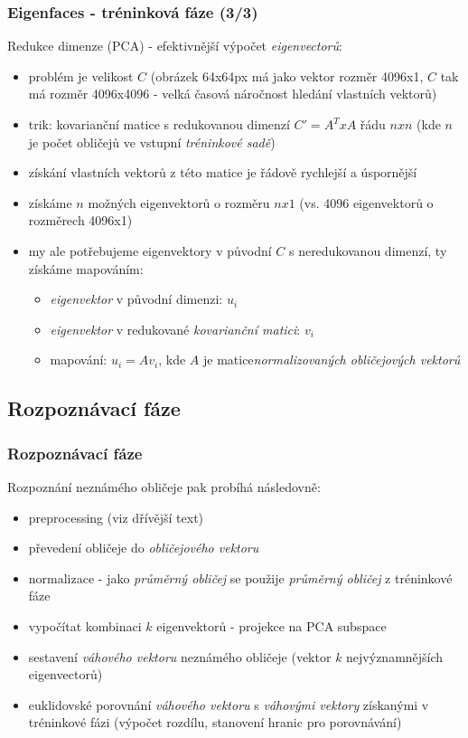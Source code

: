 \documentclass{beamer}
\begin{document}
\begin{frame}
\frametitle{Eigenfaces - tréninková fáze (3/3)}
Redukce dimenze (PCA) - efektivnější výpočet \textit{eigenvectorů}:
\begin{itemize}
\tiny
			\item problém je velikost $C$ (obrázek 64x64px má jako vektor rozměr 4096x1, $C$ tak má rozměr 4096x4096 - velká časová náročnost hledání vlastních vektorů)
			\item trik: kovarianční matice s redukovanou dimenzí $C'=A^TxA$ řádu $nxn$ (kde $n$ je počet obličejů ve vstupní \textit{tréninkové sadě})
			\item získání vlastních vektorů z této matice je řádově rychlejší a úspornější
			\item získáme $n$ možných eigenvektorů o rozměru $nx1$ (vs. 4096 eigenvektorů o rozměrech 4096x1)
			\item my ale potřebujeme eigenvektory v původní $C$ s neredukovanou dimenzí, ty získáme mapováním:
				\begin{itemize}
				\tiny
					\item \textit{eigenvektor} v původní dimenzi: $u_i$ 
					\item \textit{eigenvektor} v redukované \textit{kovarianční matici}: $v_i$
					\item mapování: $u_i=Av_i$, kde $A$ je matice\textit{normalizovaných obličejových vektorů}
				\end{itemize}
		\end{itemize}

\end{frame}

\subsection{Rozpoznávací fáze}
\begin{frame}
\frametitle{Rozpoznávací fáze}
Rozpoznání neznámého obličeje pak probíhá následovně:
\begin{itemize}
	\item preprocessing (viz dřívější text)
	\item převedení obličeje do \textit{obličejového vektoru}
	\item normalizace - jako \textit{průměrný obličej} se použije \textit{průměrný obličej} z tréninkové fáze
	\item vypočítat kombinaci $k$ eigenvektorů - projekce na PCA subspace
	\item sestavení\textit{ váhového vektoru} neznámého obličeje (vektor $k$ nejvýznamnějších eigenvectorů)
	\item euklidovské porovnání \textit{váhového vektoru} s \textit{váhovými vektory} získanými v tréninkové fázi (výpočet rozdílu, stanovení hranic pro porovnávání)
\end{itemize}

\end{frame}
\end{document}
